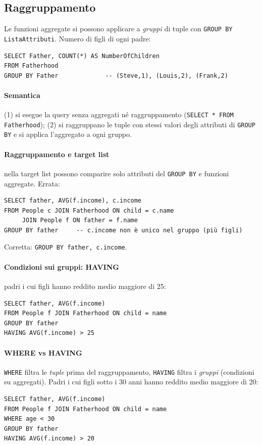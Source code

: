 \documentclass[a4paper,12pt]{article}
\begin{document}
\subsection{Raggruppamento}

Le funzioni aggregate si possono applicare a \emph{gruppi} di tuple con
\texttt{GROUP BY ListaAttributi}. Numero di figli di ogni padre:
\begin{verbatim}
SELECT Father, COUNT(*) AS NumberOfChildren
FROM Fatherhood
GROUP BY Father             -- (Steve,1), (Louis,2), (Frank,2)
\end{verbatim}

\paragraph{Semantica} (1) si esegue la query senza aggregati né raggruppamento
(\texttt{SELECT * FROM Fatherhood}); (2) si raggruppano le tuple con stessi
valori degli attributi di \texttt{GROUP BY} e si applica l'aggregato a ogni
gruppo.

\paragraph{Raggruppamento e target list} nella target list possono comparire
solo attributi del \texttt{GROUP BY} e funzioni aggregate. Errata:
\begin{verbatim}
SELECT father, AVG(f.income), c.income
FROM People c JOIN Fatherhood ON child = c.name
     JOIN People f ON father = f.name
GROUP BY father     -- c.income non è unico nel gruppo (più figli)
\end{verbatim}
Corretta: \texttt{GROUP BY father, c.income}.

\paragraph{Condizioni sui gruppi: HAVING} padri i cui figli hanno reddito medio
maggiore di 25:
\begin{verbatim}
SELECT father, AVG(f.income)
FROM People f JOIN Fatherhood ON child = name
GROUP BY father
HAVING AVG(f.income) > 25
\end{verbatim}

\paragraph{WHERE vs HAVING} \texttt{WHERE} filtra le \emph{tuple} prima del
raggruppamento, \texttt{HAVING} filtra i \emph{gruppi} (condizioni su
aggregati). Padri i cui figli sotto i 30 anni hanno reddito medio maggiore di
20:
\begin{verbatim}
SELECT father, AVG(f.income)
FROM People f JOIN Fatherhood ON child = name
WHERE age < 30
GROUP BY father
HAVING AVG(f.income) > 20
\end{verbatim}
\end{document}
